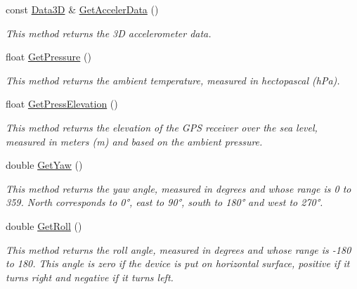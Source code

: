 \begin{DoxyCompactItemize}
\mbox{\label{classGPSInterface_a550dfc4020abe8de5d64802a15404fd2}} 
const \hyperlink{structData3D}{Data3D} \& \hyperlink{classGPSInterface_a550dfc4020abe8de5d64802a15404fd2}{Get\+Acceler\+Data} ()
\begin{DoxyCompactList}\small\item\em This method returns the 3D accelerometer data. \end{DoxyCompactList}\item 
\mbox{\label{classGPSInterface_ac0b9cef2de5103ee5ada0154cda9b326}} 
float \hyperlink{classGPSInterface_ac0b9cef2de5103ee5ada0154cda9b326}{Get\+Pressure} ()
\begin{DoxyCompactList}\small\item\em This method returns the ambient temperature, measured in hectopascal (h\+Pa). \end{DoxyCompactList}\item 
\mbox{\label{classGPSInterface_a543f9df860565afa6ebe8c280cce1ba9}} 
float \hyperlink{classGPSInterface_a543f9df860565afa6ebe8c280cce1ba9}{Get\+Press\+Elevation} ()
\begin{DoxyCompactList}\small\item\em This method returns the elevation of the G\+PS receiver over the sea level, measured in meters (m) and based on the ambient pressure. \end{DoxyCompactList}\item 
\mbox{\label{classGPSInterface_afbb49a7fc74d393a41d447bfc4dbeed7}} 
double \hyperlink{classGPSInterface_afbb49a7fc74d393a41d447bfc4dbeed7}{Get\+Yaw} ()
\begin{DoxyCompactList}\small\item\em This method returns the yaw angle, measured in degrees and whose range is 0 to 359. North corresponds to 0°, east to 90°, south to 180° and west to 270°. \end{DoxyCompactList}\item 
\mbox{\label{classGPSInterface_ae9f9c8e37b88f966ba1f12a52fcd5a16}} 
double \hyperlink{classGPSInterface_ae9f9c8e37b88f966ba1f12a52fcd5a16}{Get\+Roll} ()
\begin{DoxyCompactList}\small\item\em This method returns the roll angle, measured in degrees and whose range is -\/180 to 180. This angle is zero if the device is put on horizontal surface, positive if it turns right and negative if it turns left. \end{DoxyCompactList}\item 

\end{DoxyCompactItemize}
